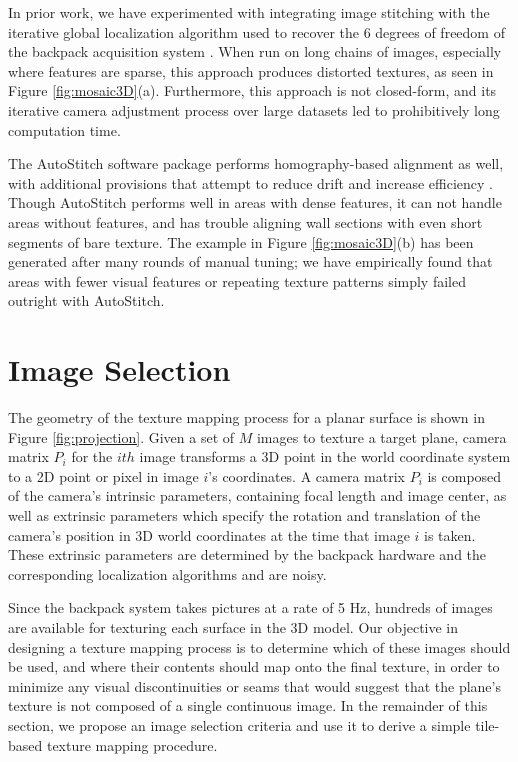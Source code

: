 \documentclass[]{spie}  %
\begin{document}
In prior work, we have experimented with integrating image stitching
with the iterative global localization algorithm used to recover the 6
degrees of freedom of the backpack acquisition system
\cite{liu2010indoor}. When run on long chains of images, especially
where features are sparse, this approach produces distorted textures,
as seen in Figure \ref{fig:mosaic3D}(a). Furthermore, this approach is
not closed-form, and its iterative camera adjustment process over
large datasets led to prohibitively long computation time.

The AutoStitch software package performs homography-based alignment as
well, with additional provisions that attempt to reduce drift and
increase efficiency \cite{panorama2d, autostitch}. Though AutoStitch
performs well in areas with dense features, it can not handle areas
without features, and has trouble aligning wall sections with even
short segments of bare texture. The example in Figure
\ref{fig:mosaic3D}(b) has been generated after many rounds of manual
tuning; we have empirically found that areas with fewer visual
features or repeating texture patterns simply failed outright with
AutoStitch.

\section{Image Selection}
\label{sec:simpleTextureMapping}

The geometry of the texture mapping process for a planar surface is
shown in Figure \ref{fig:projection}. Given a set of $M$ images to
texture a target plane, camera matrix $P_i$ for the $ith$ image
transforms a 3D point in the world coordinate system to a 2D point or
pixel in image $i$'s coordinates. A camera matrix $P_i$ is composed of
the camera's intrinsic parameters, containing focal length and image
center, as well as extrinsic parameters which specify the rotation and
translation of the camera's position in 3D world coordinates at the
time that image $i$ is taken. These extrinsic parameters are
determined by the backpack hardware and the corresponding localization
algorithms \cite{chen2010indoor, liu2010indoor, kua2012loopclosure}
and are noisy.

Since the backpack system takes pictures at a rate of 5 Hz, hundreds
of images are available for texturing each surface in the 3D
model. Our objective in designing a texture mapping process is to
determine which of these images should be used, and where their
contents should map onto the final texture, in order to minimize any
visual discontinuities or seams that would suggest that the plane's
texture is not composed of a single continuous image. In the remainder
of this section, we propose an image selection criteria and use it to
derive a simple tile-based texture mapping procedure.
\end{document}
